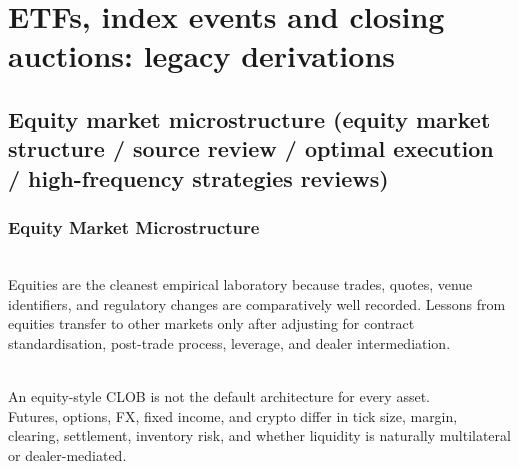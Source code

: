 \documentclass[a4paper,oneside,openany]{book}
\begin{document}
\chapter*{ETFs, index events and closing auctions: legacy derivations}

\section*{Equity market microstructure (equity market structure / source review / optimal execution / high-frequency strategies reviews)}

\subsection*{Equity Market Microstructure}

\begin{principle} \\
Equities are the cleanest empirical laboratory because trades, quotes, venue identifiers, and regulatory changes are comparatively well recorded. Lessons from equities transfer to other markets only after adjusting for contract standardisation, post-trade process, leverage, and dealer intermediation.
\end{principle}

\begin{caveat} \\
An equity-style CLOB is not the default architecture for every asset.\\
Futures, options, FX, fixed income, and crypto differ in tick size, margin, clearing, settlement, inventory risk, and whether liquidity is naturally multilateral or dealer-mediated.
\end{caveat}
\end{document}

